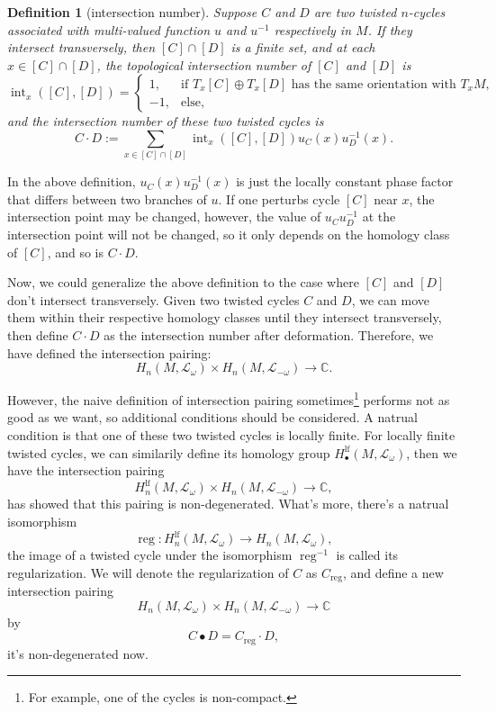 \documentclass[11pt]{article}
\newcommand{\cc}{\mathbb{C}}
\theoremstyle{definition}
\theoremstyle{plain}
\newtheorem{defi}[para]{Definition}
\begin{document}
\begin{defi}[intersection number]
Suppose $C$ and $D$ are two twisted $n$-cycles 
associated with multi-valued function $u$ and $u^{-1}$ 
respectively in $M$. 
If they intersect transversely, then $[C]\cap [D]$ is a
finite set, and at each $x\in [C]\cap [D]$, the topological 
intersection number of $[C]$ and $[D]$ is 
\[
	\operatorname{int}_x([C],[D])=
	\begin{cases}
	1, & \text{if $T_x[C]\oplus T_x[D]$ has the same orientation with $T_xM$},\\
	-1,& \text{else},
	\end{cases}
\]
and the intersection number of these two 
twisted cycles is 
\[
	C\cdot D:=\sum_{x\in [C]\cap [D]}\operatorname{int}_x([C],[D])
	u_C(x)u^{-1}_D(x).
\]
\end{defi}

In the above definition, $u_C(x)u_D^{-1}(x)$ is just the locally constant 
phase factor that differs between two branches of $u$.
If one perturbs cycle 
$[C]$ near $x$, the intersection point may be changed, 
however, the value of $u_Cu_D^{-1}$ at the intersection point will 
not be changed, so it only depends on the homology class of $[C]$, 
and so is $C\cdot D$.

Now, we could generalize the above definition to the case where
$[C]$ and $[D]$ don't intersect transversely. Given two twisted
cycles $C$ and $D$, we can move them within their respective 
homology classes until they intersect transversely, then define
$C\cdot D$ as the intersection number after deformation. Therefore,
we have defined the intersection pairing:
\[
	H_n(M,\mathcal L_{\omega})\times H_n(M,\mathcal L_{-\omega})
	\to \cc.
\]


However, the naive definition of intersection pairing 
sometimes\footnote{For example, one of the cycles is non-compact.} 
performs not as good as we want, so additional
conditions should be considered. A natrual condition is that
one of these two twisted cycles is locally finite. 
For locally finite twisted cycles, we can similarily define
its homology group $H^{\text{lf}}_\bullet(M,\mathcal L_\omega)$,
then we have the intersection pairing 
\[
	H^{\text{lf}}_n(M,\mathcal L_{\omega})\times H_n(M,\mathcal L_{-\omega})
	\to \cc,
\]
\cite{aomoto2011theory,kita1994intersection} has showed that this pairing is non-degenerated. What's more,
there's a natrual isomorphism
\[
	\operatorname{reg}:H^{\text{lf}}_n(M,\mathcal L_{\omega})
	\to H_n(M,\mathcal L_{\omega}),
\]
the image of a twisted cycle under the isomorphism
$\operatorname{reg}^{-1}$ is called its regularization.
We will denote the regularization of $C$ as $C_{\text{reg}}$, and 
define a new intersection pairing
\[
	H_n(M,\mathcal L_{\omega})\times H_n(M,\mathcal L_{-\omega})
	\to \cc
\]
by
\[
	C\bullet D = C_{\text{reg}}\cdot D,
\]
it's non-degenerated now.
\end{document}
